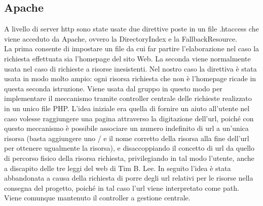 \subsection{Apache}
A livello di server http sono state usate due direttive poste in un file .htaccess che viene acceduto da Apache, ovvero la DirectoryIndex e la FallbackResource.\\
La prima consente di impostare un file da cui far partire l'elaborazione nel caso la richiesta effettuata sia l'homepage del sito Web.
La seconda viene normalmente usata nel caso di richieste a risorse inesistenti.
Nel nostro caso la direttiva è stata usata in modo molto ampio: ogni risorsa richiesta che non è l'homepage ricade in questa seconda istruzione.
Viene usata dal gruppo in questo modo per implementare il meccanismo tramite controller centrale delle richieste realizzato in un unico file PHP.
L'idea iniziale era quella di fornire un aiuto all'utente nel caso volesse raggiungere una pagina attraverso la digitazione dell'url, poiché con questo meccanismo è possibile associare un numero indefinito di url a un'unica risorsa (basta aggiungere uno / e il nome corretto della risorsa alla fine dell'url per ottenere ugualmente la risorsa), e disaccoppiando il concetto di url da quello di percorso fisico della risorsa richiesta, privilegiando in tal modo l'utente, anche a discapito delle tre leggi del web di Tim B. Lee.
In seguito l'idea è stata abbandonata a causa della richiesta di porre degli url relativi per le risorse nella consegna del progetto, poiché in tal caso l'url viene interpretato come path.\\Viene comunque mantenuto il controller a gestione centrale.

